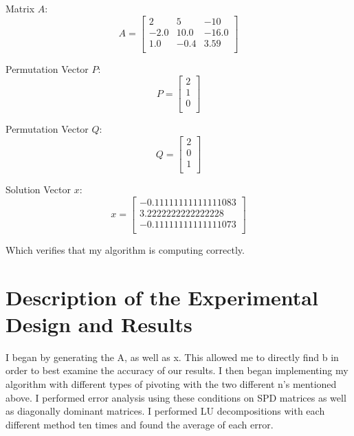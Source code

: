 \documentclass[12pt, letterpaper]{article}
\begin{document}
\begin{minipage}{0.3\textwidth}
   \centering
   Matrix $A$:
   \[
   A = \begin{bmatrix}
   2 & 5 & -10 \\
   -2.0 & 10.0 & -16.0 \\
   1.0 & -0.4 & 3.59 \\
   \end{bmatrix}
   \]
\end{minipage}
\hfill
\begin{minipage}{0.2\textwidth}
   \centering
   Permutation Vector $P$:
   \[
   P = \begin{bmatrix}
   2 \\
   1 \\
   0 \\
   \end{bmatrix}
   \]
\end{minipage}
\hfill
\begin{minipage}{0.2\textwidth}
   \centering
   Permutation Vector $Q$:
   \[
   Q = \begin{bmatrix}
   2 \\
   0 \\
   1 \\
   \end{bmatrix}
   \]
\end{minipage}
\hfill
\begin{minipage}{0.3\textwidth}
   \centering
   Solution Vector $x$:
   \[
   x = \begin{bmatrix}
   -0.11111111111111083 \\
   3.2222222222222228 \\
   -0.11111111111111073 \\
   \end{bmatrix}
   \]
\end{minipage}

Which verifies that my algorithm is computing correctly.


\section{Description of the Experimental Design and Results}

I began by generating the A, as well as x. This allowed me to directly find b in order to best examine the accuracy of our results. I then began implementing my algorithm with different types of pivoting with the two different n's mentioned above. I performed error analysis using these conditions on SPD matrices as well as diagonally dominant matrices.
I performed LU decompositions with each different method ten times and found the average of each error.
\end{document}
